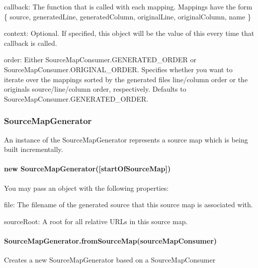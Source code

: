 \begin{DoxyItemize}
\item {\ttfamily callback}\+: The function that is called with each mapping. Mappings have the form {\ttfamily \{ source, generated\+Line, generated\+Column, original\+Line, original\+Column, name \}}
\item {\ttfamily context}\+: Optional. If specified, this object will be the value of {\ttfamily this} every time that {\ttfamily callback} is called.
\item {\ttfamily order}\+: Either {\ttfamily Source\+Map\+Consumer.\+G\+E\+N\+E\+R\+A\+T\+E\+D\+\_\+\+O\+R\+D\+E\+R} or {\ttfamily Source\+Map\+Consumer.\+O\+R\+I\+G\+I\+N\+A\+L\+\_\+\+O\+R\+D\+E\+R}. Specifies whether you want to iterate over the mappings sorted by the generated file\textquotesingle{}s line/column order or the original\textquotesingle{}s source/line/column order, respectively. Defaults to {\ttfamily Source\+Map\+Consumer.\+G\+E\+N\+E\+R\+A\+T\+E\+D\+\_\+\+O\+R\+D\+E\+R}.
\end{DoxyItemize}

\subsubsection*{Source\+Map\+Generator}

An instance of the Source\+Map\+Generator represents a source map which is being built incrementally.

\paragraph*{new Source\+Map\+Generator(\mbox{[}start\+Of\+Source\+Map\mbox{]})}

You may pass an object with the following properties\+:


\begin{DoxyItemize}
\item {\ttfamily file}\+: The filename of the generated source that this source map is associated with.
\item {\ttfamily source\+Root}\+: A root for all relative U\+R\+Ls in this source map.
\end{DoxyItemize}

\paragraph*{Source\+Map\+Generator.\+from\+Source\+Map(source\+Map\+Consumer)}

Creates a new Source\+Map\+Generator based on a Source\+Map\+Consumer


